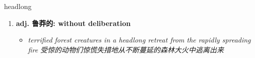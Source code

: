
\begin{frame}
{\huge headlong}
\begin{center}
\begin{enumerate}\Large
  \item \textbf{adj. 鲁莽的: without deliberation}
  \begin{itemize}
    \item \em{\Large{terrified forest creatures in a headlong retreat from the rapidly spreading fire 受惊的动物们惊慌失措地从不断蔓延的森林大火中逃离出来}}
  \end{itemize}
\end{enumerate}
\end{center}
\end{frame}
